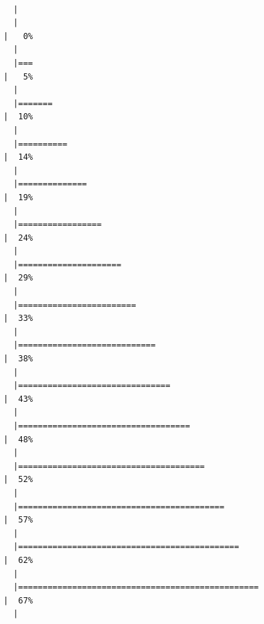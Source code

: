 \begin{verbatim}

  |                                                                               
  |                                                                         |   0%
  |                                                                               
  |===                                                                      |   5%
  |                                                                               
  |=======                                                                  |  10%
  |                                                                               
  |==========                                                               |  14%
  |                                                                               
  |==============                                                           |  19%
  |                                                                               
  |=================                                                        |  24%
  |                                                                               
  |=====================                                                    |  29%
  |                                                                               
  |========================                                                 |  33%
  |                                                                               
  |============================                                             |  38%
  |                                                                               
  |===============================                                          |  43%
  |                                                                               
  |===================================                                      |  48%
  |                                                                               
  |======================================                                   |  52%
  |                                                                               
  |==========================================                               |  57%
  |                                                                               
  |=============================================                            |  62%
  |                                                                               
  |=================================================                        |  67%
  |                                                                               

\end{verbatim}
